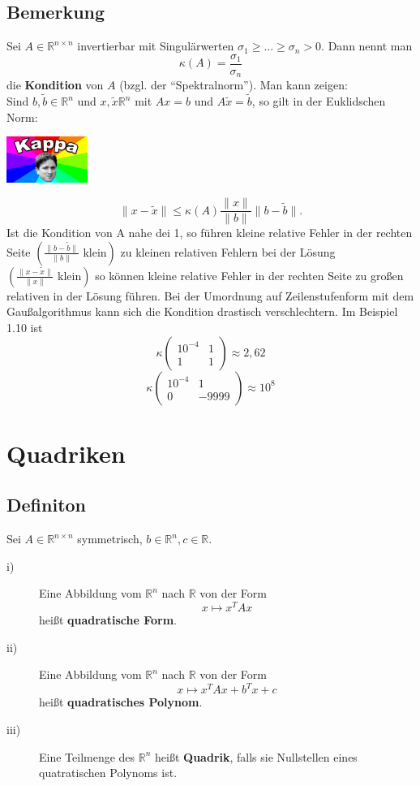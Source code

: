 \documentclass{scrbook}
\begin{document}
\section{Bemerkung}
Sei $A \in \mathbb{R}^{n\times n}$ invertierbar mit Singulärwerten $\sigma_1 \geq ... \geq \sigma_n > 0$. Dann nennt man
\[\kappa(A) = \frac{\sigma_1}{\sigma_n}\]
die \textbf{Kondition} von $A$ (bzgl. der "`Spektralnorm"'). Man kann zeigen:\\
Sind $b, \tilde{b} \in \mathbb{R}^n$ und $x, \tilde{x} \mathbb{R}^n$ mit $Ax = b$ und $A \tilde{x} = \tilde{b}$, so gilt in der Euklidschen Norm:
\\
\begin{center}
\includegraphics[width = 100px]{Kappa.jpeg}
\end{center}
\[
\| x - \tilde{x} \| \leq \kappa (A) \frac{\|x\|}{\|b\|}\|b-\tilde{b}\|.
\]
Ist die Kondition von A nahe dei 1, so führen kleine relative Fehler in der rechten Seite $\left( \frac{\| b- \tilde{b} \|}{\|b\|} \text{ klein}\right)$ zu kleinen relativen Fehlern bei der Lösung $\left( \frac{\| x- \tilde{x} \|}{\|x\|} \text{ klein}\right)$ so können kleine relative Fehler in der rechten Seite zu großen relativen in der Lösung führen. Bei der Umordnung auf Zeilenstufenform mit dem Gaußalgorithmus kann sich die Kondition drastisch verschlechtern. Im Beispiel 1.10 ist
\[
\kappa \left(
\begin{array}{cc}
10^{-4}&1\\
1&1
\end{array}
\right) \approx 2,62
\]
\[
\kappa \left(
\begin{array}{cc}
10^{-4}&1\\
0&-9999
\end{array}
\right) \approx 10^8
\]
\chapter{Quadriken}
\section{Definiton}
Sei $A \in \mathbb{R}^{n \times n}$ symmetrisch, $b \in \mathbb{R}^n, c \in \mathbb{R}$.
\begin{description}
\item[i)] Eine Abbildung vom $\mathbb{R}^n$ nach $\mathbb{R}$ von der Form
\[x \mapsto x^TAx\] heißt \textbf{quadratische Form}.
\item[ii)] Eine Abbildung vom $\mathbb{R}^n$ nach $\mathbb{R}$ von der Form
\[x \mapsto x^TAx + b^Tx +c\]
heißt \textbf{quadratisches Polynom}.
\item[iii)] Eine Teilmenge des $\mathbb{R}^n$ heißt \textbf{Quadrik}, falls sie Nullstellen eines quatratischen Polynoms ist.
\end{description}
\end{document}

